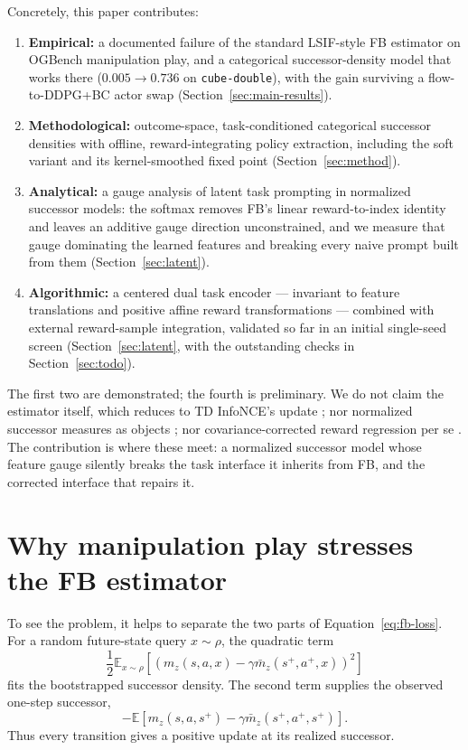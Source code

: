 \documentclass{article}
\newcommand{\E}{\mathbb{E}}
\begin{document}
Concretely, this paper contributes:
\begin{enumerate}
\item \textbf{Empirical:} a documented failure of the standard LSIF-style FB estimator on OGBench manipulation play, and a categorical successor-density model that works there ($0.005 \to 0.736$ on \texttt{cube-double}), with the gain surviving a flow-to-DDPG+BC actor swap (Section~\ref{sec:main-results}).
\item \textbf{Methodological:} outcome-space, task-conditioned categorical successor densities with offline, reward-integrating policy extraction, including the soft variant and its kernel-smoothed fixed point (Section~\ref{sec:method}).
\item \textbf{Analytical:} a gauge analysis of latent task prompting in normalized successor models: the softmax removes FB's linear reward-to-index identity and leaves an additive gauge direction unconstrained, and we measure that gauge dominating the learned features and breaking every naive prompt built from them (Section~\ref{sec:latent}).
\item \textbf{Algorithmic:} a centered dual task encoder --- invariant to feature translations and positive affine reward transformations --- combined with external reward-sample integration, validated so far in an initial single-seed screen (Section~\ref{sec:latent}, with the outstanding checks in Section~\ref{sec:todo}).
\end{enumerate}
The first two are demonstrated; the fourth is preliminary.
We do not claim the estimator itself, which reduces to TD InfoNCE's update \citep[Proposition~\ref{prop:tdinfonce};][]{zheng2024tdinfonce}; nor normalized successor measures as objects \citep{farebrother2025tdflows,shribak2024bellmandiffusion,zheng2026infom}; nor covariance-corrected reward regression per se \citep{cetin2024finer,rupf2026optibfm}.
The contribution is where these meet: a normalized successor model whose feature gauge silently breaks the task interface it inherits from FB, and the corrected interface that repairs it.

\section{Why manipulation play stresses the FB estimator}
\label{sec:play}

To see the problem, it helps to separate the two parts of Equation~\ref{eq:fb-loss}.
For a random future-state query $x\sim\rho$, the quadratic term
\begin{equation}
\frac12
\E_{x\sim\rho}
\left[
    \left(
        m_z(s,a,x)
        -
        \gamma\bar m_z(s^+,a^+,x)
    \right)^2
\right]
\end{equation}
fits the bootstrapped successor density.
The second term supplies the observed one-step successor,
\begin{equation}
-
\E\left[
    m_z(s,a,s^+)
    -
    \gamma\bar m_z(s^+,a^+,s^+)
\right].
\end{equation}
Thus every transition gives a positive update at its realized successor.
\end{document}
